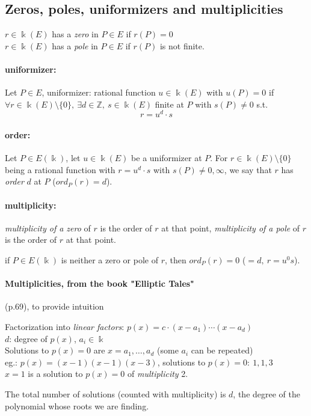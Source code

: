 \documentclass{article}
\theoremstyle{definition}
\begin{document}
\subsection{Zeros, poles, uniformizers and multiplicities}

$r \in \Bbbk(E)$ has a \emph{zero} in $P\in E$ if $r(P)=0$\\
$r \in \Bbbk(E)$ has a \emph{pole} in $P\in E$ if $r(P)$ is not finite.

\paragraph{uniformizer:} Let $P\in E$,
uniformizer: rational function $u \in \Bbbk(E)$ with $u(P)=0$ if
$\forall r\in \Bbbk(E) \setminus \{0\},~ \exists d \in \mathbb{Z},~ s\in \Bbbk(E)$ finite at $P$ with $s(P) \neq 0$ s.t.
$$r=u^d \cdot s$$

\paragraph{order:} Let $P \in E(\Bbbk)$, let $u \in \Bbbk(E)$ be a uniformizer at $P$.
For $r \in \Bbbk(E) \setminus \{0\}$ being a rational function with $r=u^d \cdot s$ with $s(P)\neq 0, \infty$, we say that $r$ has \emph{order} $d$ at $P$ ($ord_P(r)=d$).

\paragraph{multiplicity:} \emph{multiplicity of a zero} of $r$ is the order of $r$ at that point, \emph{multiplicity of a pole} of $r$ is the order of $r$ at that point.

if $P \in E(\Bbbk)$ is neither a zero or pole of $r$, then $ord_P(r)=0$ ($=d,~ r=u^0s$).

\vspace{0.5cm}
\begin{minipage}{4.3 in}
    \paragraph{Multiplicities, from the book "Elliptic Tales"} (p.69), to provide intuition

    Factorization into \emph{linear factors}: $p(x)=c\cdot (x-a_1) \cdots (x-a_d)$\\
    $d$: degree of $p(x)$, $a_i \in \Bbbk$\\
    Solutions to $p(x)=0$ are $x=a_1, \ldots, a_d$ (some $a_i$ can be repeated)\\
    eg.: $p(x)=(x-1)(x-1)(x-3)$, solutions to $p(x)=0:~ 1, 1, 3$\\
    $x=1$ is a solution to $p(x)=0$ of \emph{multiplicity} 2.

    The total number of solutions (counted with multiplicity) is $d$, the degree of the polynomial whose roots we are finding.
\end{minipage}
\end{document}
